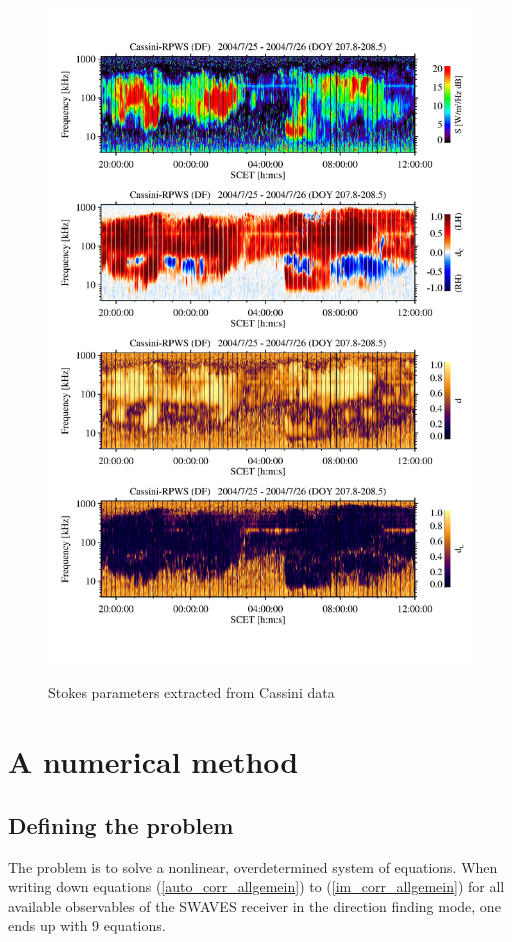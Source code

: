\documentclass[a4paper,14pt]{extbook}
\begin{document}
\begin{figure}
  \includegraphics[width=12cm]{uli2.eps}\\
  \caption{Stokes parameters extracted from Cassini data \cite{uli1}}\label{fig_uli2}
\end{figure}


\section{A numerical method}

\subsection{Defining the problem}

The problem is to solve a nonlinear, overdetermined system of equations. When writing down equations (\ref{auto_corr_allgemein}) to (\ref{im_corr_allgemein}) for all available observables of the SWAVES receiver in the direction finding mode, one ends up with 9 equations. \\
\end{document}

